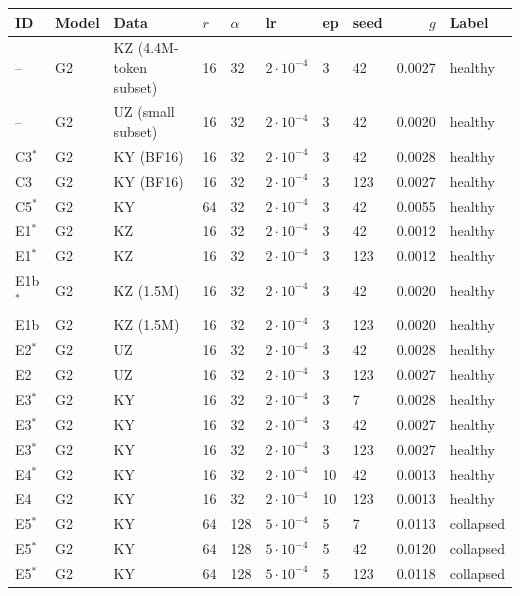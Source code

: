 \documentclass[11pt]{article}
\begin{document}
\begin{table}[!htbp]
\centering
\tiny
\setlength{\tabcolsep}{3pt}
\begin{tabular}{llllllllrl}
\toprule
\textbf{ID} & \textbf{Model} & \textbf{Data} & $r$ & $\alpha$ & \textbf{lr} & \textbf{ep} & \textbf{seed} & $g$ & \textbf{Label} \\
\midrule
-- & G2 & KZ (4.4M-token subset) & 16 & 32 & $2{\cdot}10^{-4}$ & 3 & 42 & 0.0027 & healthy \\
-- & G2 & UZ (small subset) & 16 & 32 & $2{\cdot}10^{-4}$ & 3 & 42 & 0.0020 & healthy \\
C3$^\ast$ & G2 & KY (BF16) & 16 & 32 & $2{\cdot}10^{-4}$ & 3 & 42 & 0.0028 & healthy \\
C3 & G2 & KY (BF16) & 16 & 32 & $2{\cdot}10^{-4}$ & 3 & 123 & 0.0027 & healthy \\
C5$^\ast$ & G2 & KY & 64 & 32 & $2{\cdot}10^{-4}$ & 3 & 42 & 0.0055 & healthy \\
E1$^\ast$ & G2 & KZ & 16 & 32 & $2{\cdot}10^{-4}$ & 3 & 42 & 0.0012 & healthy \\
E1$^\ast$ & G2 & KZ & 16 & 32 & $2{\cdot}10^{-4}$ & 3 & 123 & 0.0012 & healthy \\
E1b$^\ast$ & G2 & KZ (1.5M) & 16 & 32 & $2{\cdot}10^{-4}$ & 3 & 42 & 0.0020 & healthy \\
E1b & G2 & KZ (1.5M) & 16 & 32 & $2{\cdot}10^{-4}$ & 3 & 123 & 0.0020 & healthy \\
E2$^\ast$ & G2 & UZ & 16 & 32 & $2{\cdot}10^{-4}$ & 3 & 42 & 0.0028 & healthy \\
E2 & G2 & UZ & 16 & 32 & $2{\cdot}10^{-4}$ & 3 & 123 & 0.0027 & healthy \\
E3$^\ast$ & G2 & KY & 16 & 32 & $2{\cdot}10^{-4}$ & 3 & 7 & 0.0028 & healthy \\
E3$^\ast$ & G2 & KY & 16 & 32 & $2{\cdot}10^{-4}$ & 3 & 42 & 0.0027 & healthy \\
E3$^\ast$ & G2 & KY & 16 & 32 & $2{\cdot}10^{-4}$ & 3 & 123 & 0.0027 & healthy \\
E4$^\ast$ & G2 & KY & 16 & 32 & $2{\cdot}10^{-4}$ & 10 & 42 & 0.0013 & healthy \\
E4 & G2 & KY & 16 & 32 & $2{\cdot}10^{-4}$ & 10 & 123 & 0.0013 & healthy \\
E5$^\ast$ & G2 & KY & 64 & 128 & $5{\cdot}10^{-4}$ & 5 & 7 & 0.0113 & collapsed \\
E5$^\ast$ & G2 & KY & 64 & 128 & $5{\cdot}10^{-4}$ & 5 & 42 & 0.0120 & collapsed \\
E5$^\ast$ & G2 & KY & 64 & 128 & $5{\cdot}10^{-4}$ & 5 & 123 & 0.0118 & collapsed \\

\end{tabular}
\end{table}
\end{document}
